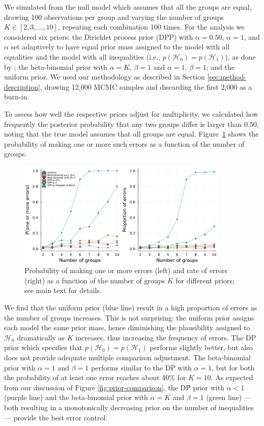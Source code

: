 \documentclass[11pt,a4paper]{article}
\theoremstyle{definition} %
\theoremstyle{case}
\begin{document}
We simulated from the null model which assumes that all the groups are equal, drawing 100 observations per group and varying the number of groups $K \in [2, 3, \dots, 10]$, repeating each combination 100 times. For the analysis we considered six priors: the Dirichlet process prior (DPP) with $\alpha = 0.50$, $\alpha = 1$, and $\alpha$ set adaptively to have equal prior mass assigned to the model with all equalities and the model with all inequalities (i.e., $p(\mathcal{H}_0) = p(\mathcal{H}_1)$), as done by \textcite{gopalan1998bayesian}; the beta-binomial prior with $\alpha = K , \, \beta = 1$ and $\alpha = 1, \, \beta = 1$; and the uniform prior. We used our methodology as described in Section \ref{sec:method-description}, drawing 12,000 MCMC samples and discarding the first 2,000 as a burn-in.

To assess how well the respective priors adjust for multiplicity, we calculated how frequently the posterior probability that any two groups differ is larger than 0.50, noting that the true model assumes that all groups are equal. Figure~\ref{fig:small_simulation} shows the probability of making one or more such errors as a function of the number of groups.
\begin{figure}
    \centering
    \includegraphics[width=0.90\textwidth]{figures//multipleComparisonPlot_side_by_side.pdf}
    \caption{Probability of making one or more errors (left) and rate of errors (right) as a function of the number of groups $K$ for different priors; see main text for details.}
    \label{fig:small_simulation}
\end{figure}
We find that the uniform prior (blue line) result in a high proportion of errors as the number of groups increases. This is not surprising: the uniform prior assigns each model the same prior mass, hence diminishing the plausibility assigned to $\mathcal{H}_0$ dramatically as $K$ increases, thus increasing the frequency of errors. The DP prior which specifies that $p(\mathcal{H}_0) = p(\mathcal{H}_1)$ performs slightly better, but also does not provide adequate multiple comparison adjustment. The beta-binomial prior with $\alpha = 1$ and $\beta = 1$ performs similar to the DP with $\alpha = 1$, but for both the probability of at least one error reaches about 40\% for $K = 10$. As expected from our discussion of Figure \ref{fig:prior-comparison}, the DP prior with $\alpha < 1$ (purple line) and the beta-binomial prior with $\alpha = K$ and $\beta = 1$ (green line) --- both resulting in a monotonically decreasing prior on the number of inequalities --- provide the best error control.
\end{document}
